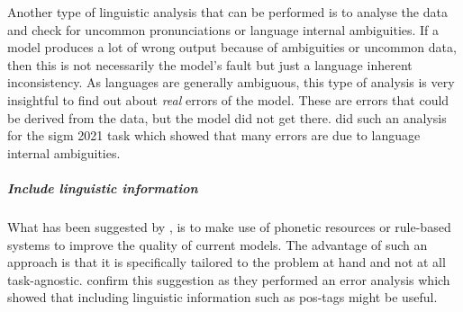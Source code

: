 Another type of linguistic analysis that can be performed is to analyse the data and check for uncommon pronunciations or language internal ambiguities. If a model produces a lot of wrong output because of ambiguities or uncommon data, then this is not necessarily the model's fault but just a language inherent inconsistency. As languages are generally ambiguous, this type of analysis is very insightful to find out about \textit{real} errors of the model. These are errors that could be derived from the data, but the model did not get there. \cite{Ashby-Bartley.2021} did such an analysis for the \ac{sigm} 2021 task which showed that many errors are due to language internal ambiguities.


\subparagraph{Include linguistic information} What has been suggested by \cite{gorman-etal-2020-sigmorphon}, is to make use of phonetic resources or rule-based systems to improve the quality of current models. The advantage of such an approach is that it is specifically tailored to the problem at hand and not at all task-agnostic. \cite{makarov-clematide-2020-cluzh} confirm this suggestion as they performed an error analysis which showed that including linguistic information such as \ac{pos}-tags might be useful. 

